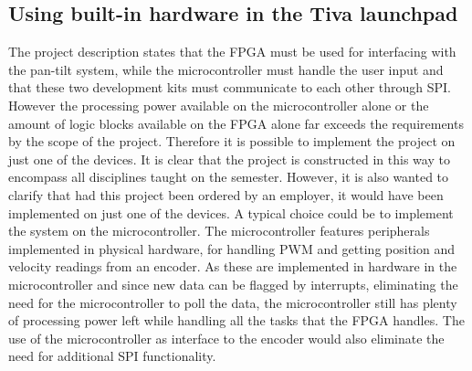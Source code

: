 \documentclass[../../main.tex]{subfiles}
\begin{document}
\subsection*{Using built-in hardware in the Tiva launchpad}
The project description states that the FPGA must be used for interfacing with the pan-tilt system, while the microcontroller must handle the user input and that these two development kits must communicate to each other through SPI. However the processing power available on the microcontroller alone or the amount of logic blocks available on the FPGA alone far exceeds the requirements by the scope of the project. Therefore it is possible to implement the project on just one of the devices. It is clear that the project is constructed in this way to encompass all disciplines taught on the semester. However, it is also wanted to clarify that had this project been ordered by an employer, it would have been implemented on just one of the devices. A typical choice could be to implement the system on the microcontroller. The microcontroller features peripherals implemented in physical hardware, for handling PWM and getting position and velocity readings from an encoder. As these are implemented in hardware in the microcontroller and since new data can be flagged by interrupts, eliminating the need for the microcontroller to poll the data, the microcontroller still has plenty of processing power left while handling all the tasks that the FPGA handles. The use of the microcontroller as interface to the encoder would also eliminate the need for additional SPI functionality.

\end{document}

